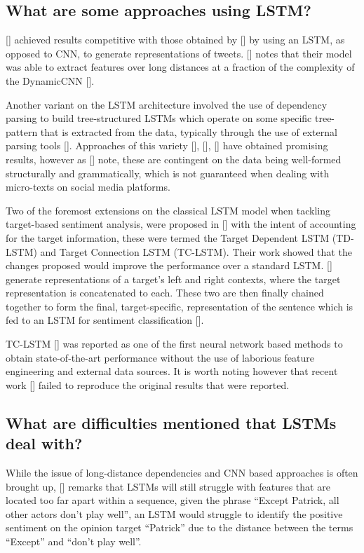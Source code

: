 \documentclass[12pt, a4paper]{report}
\theoremstyle{definition}
\theoremstyle{definition}%
\theoremstyle{definition}%
\theoremstyle{definition}%
\theoremstyle{definition}%
\theoremstyle{definition}%
\renewcommand{\cite}[1]{[\citealp{#1}]}
\begin{document}
\subsection{What are some approaches using LSTM?}
\cite{wang} achieved results competitive with those obtained by \cite{kalchbrenner2014} by using an LSTM, as opposed to CNN, to generate representations of tweets. \cite{young2017} notes that their model was able to extract features over long distances at a fraction of the complexity of the DynamicCNN \cite{kalchbrenner2014}.

Another variant on the LSTM architecture involved the use of dependency parsing to build tree-structured LSTMs which operate on some specific tree-pattern that is extracted from the data, typically through the use of external parsing tools \cite{socher2013}. Approaches of this variety \cite{jiweili2015}, \cite{kaishengtai2015}, \cite{zhu2015} have obtained promising results, however as \cite{chen2017} note, these are contingent on the data being well-formed structurally and grammatically, which is not guaranteed when dealing with micro-texts on social media platforms.

Two of the foremost extensions on the classical LSTM model when tackling target-based sentiment analysis, were proposed in \cite{tang2016b} with the intent of accounting for the target information, these were termed the Target Dependent LSTM (TD-LSTM) and Target Connection LSTM (TC-LSTM). Their work showed that the changes proposed would improve the performance over a standard LSTM. \cite{tang2016b} generate representations of a target's left and right contexts, where the target representation is concatenated to each. These two are then finally chained together to form the final, target-specific, representation of the sentence which is fed to an LSTM for sentiment classification \cite{dehongma2017}.

TC-LSTM \cite{tang2016b} was reported as one of the first neural network based methods to obtain state-of-the-art performance without the use of laborious feature engineering and external data sources. It is worth noting however that recent work \cite{moore2018} failed to reproduce the original results that were reported.

\subsection{What are difficulties mentioned that LSTMs deal with?}
While the issue of long-distance dependencies and CNN based approaches is often brought up, \cite{chen2017} remarks that LSTMs will still struggle with features that are located too far apart within a sequence, given the phrase \enquote{Except Patrick, all other actors don’t play well}, an LSTM would struggle to identify the positive sentiment on the opinion target \enquote{Patrick} due to the distance between the terms \enquote{Except} and \enquote{don't play well}.
\end{document}
